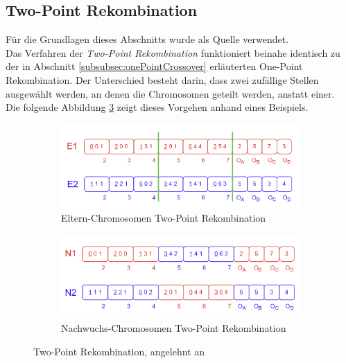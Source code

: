 \subsection{Two-Point Rekombination}
\label{subsubsec:twoPointCrossover}

Für die Grundlagen dieses Abschnitts wurde \cite{pavai_survey_2017} als Quelle verwendet.\\
Das Verfahren der \emph{Two-Point Rekombination} funktioniert beinahe identisch zu der in Abschnitt \ref{subsubsec:onePointCrossover} erläuterten One-Point Rekombination.
Der Unterschied besteht darin, dass zwei zufällige Stellen ausgewählt werden, an denen die Chromosomen geteilt werden, anstatt einer.\\
Die folgende Abbildung \ref{fig:twoPointGesamt} zeigt dieses Vorgehen anhand eines Beispiels.

\begin{figure}[H]
    \centering
    \begin{subfigure}[b]{\textwidth}
    	\centering
    	\includegraphics[scale = 0.55]{Bilder/BeispielTwoPointCrossover.png}
    	\caption{Eltern-Chromosomen Two-Point Rekombination}
    	\label{fig:twoPointCrossoverEltern}
    \end{subfigure}
    
    \hfill
    
    \begin{subfigure}[b]{\textwidth}
    	\centering
    	\includegraphics[scale = 0.55]{Bilder/BeispielTwoPointCrossover2.png}
    	\caption{Nachwuchs-Chromosomen Two-Point Rekombination}
    	\label{fig:twoPointCrossoverNachwuchs}
    \end{subfigure}
    \caption{Two-Point Rekombination, angelehnt an \cite{torabi_using_2022}}
    \label{fig:twoPointGesamt}
\end{figure}

